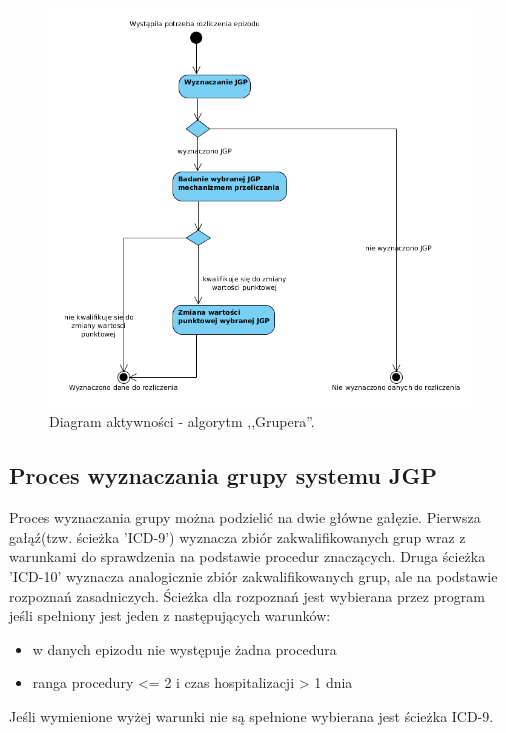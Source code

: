 \begin{figure}[!ht]
\centering
\includegraphics[scale=0.4]{images/activity-gruper}
\caption[Diagram aktywności]{Diagram aktywności - algorytm ,,Grupera''.}
\label{img:diagram_activity_gruper}
\end{figure}

\newpage
\subsection{Proces wyznaczania grupy systemu JGP}
\label{sec:procesWyznaczaniaGrupySystemuJGP}
Proces wyznaczania grupy można podzielić na dwie główne gałęzie. Pierwsza gałąź(tzw. ścieżka 'ICD-9') wyznacza zbiór zakwalifikowanych grup wraz z warunkami do sprawdzenia na podstawie procedur znaczących. Druga ścieżka 'ICD-10' wyznacza analogicznie zbiór zakwalifikowanych grup, ale na podstawie rozpoznań zasadniczych. Ścieżka dla rozpoznań jest wybierana przez program jeśli spełniony jest jeden z następujących warunków:
\begin{itemize}\itemsep2pt
\item w danych epizodu nie występuje żadna procedura
\item ranga procedury <= 2 i czas hospitalizacji > 1 dnia
\end{itemize}
Jeśli wymienione wyżej warunki nie są spełnione wybierana jest ścieżka ICD-9\cite{algorytm_grupera}.

